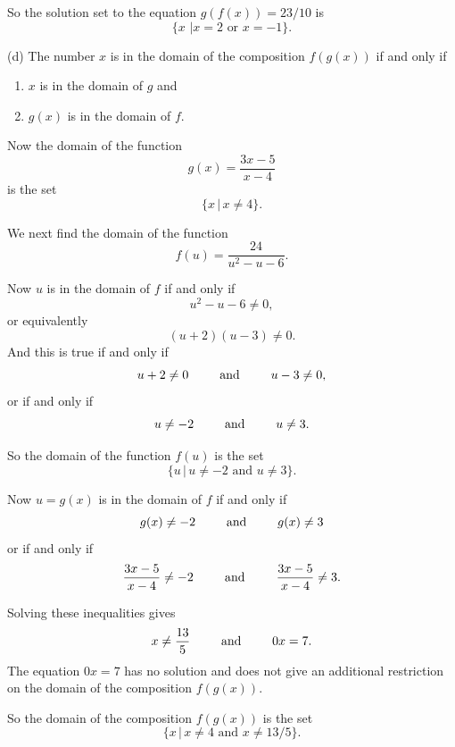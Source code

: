 \documentclass{ximera}
\begin{document}
\begin{example}
\begin{explanation}
\begin{enumerate}
So the solution set to the equation $g(f(x))=23/10$ is
\[
 \{ x \, \, | x =2 \text{ or } x=-1 \}.
\]
\end{enumerate}

(d) The number $x$ is in the domain of the composition $f(g(x))$ if and only if
\begin{enumerate}
      \item $x$ is in the domain of $g$ and
      \item $g(x)$ is in the domain of $f$.
\end{enumerate}

Now the domain of the function
\[
   g(x) = \frac{3x-5}{x-4}
\]
is the set
\[
   \{  x \, | \, x\neq 4 \}.
\]

We next find the domain of the function
\[
   f(u) = \frac{24}{u^2 - u -6}.
\]

Now $u$ is in the domain of $f$ if and only if
\[
  u^2 - u - 6 \neq 0,
\]
or equivalently
\[
  (u+2)(u-3) \neq 0.
\]
And this is true if and only if
\[
    u + 2 \neq 0 \hskip 0.3 in \text{ and } \hskip 0.3in  u-3 \neq 0,
\]
or if and only if
\[
    u\neq -2 \hskip 0.3 in \text{ and } \hskip 0.3in  u \neq 3.
\]

So the domain of the function $f(u)$ is the set
\[
  \{ u \, |\, u\neq -2 \text{ and } u\neq 3 \}.
\] 

Now $u=g(x)$ is in the domain of $f$ if and only if
\[
    g(x) \neq -2 \hskip 0.3 in \text{ and } \hskip 0.3in g(x) \neq  3
\]
or if and only if
\[
    \frac{3x-5}{x-4}\neq -2 \hskip 0.3 in \text{ and } \hskip 0.3in \frac{3x-5}{x-4}\neq 3.
\]

Solving these inequalities gives
\[
     x \neq \frac{13}{5} \hskip 0.3 in \text{ and }\hskip 0.3 in 0x = 7.
\]
The equation $0x = 7$ has no solution and does not give an additional restriction on the domain of the composition $f(g(x))$. 

So the domain of the composition $f(g(x))$ is the set
\[
 \{ x \, | \, x\neq 4  \text{ and }  x\neq 13/5 \}.
\]

\end{explanation}

\end{example}
\end{document}
